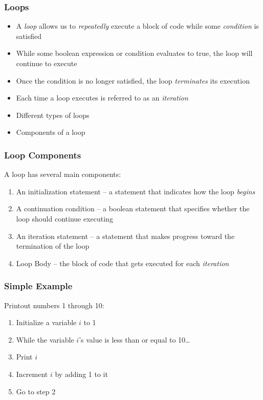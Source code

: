 \documentclass[]{beamer}
\begin{document}
\begin{frame}
  \frametitle{Loops}

  \begin{itemize}[<+->]
    \item A \emph{loop} allows us to \emph{repeatedly} execute a 
      block of code while some \emph{condition} is satisfied
    \item While some boolean expression or condition evaluates to true, the loop will continue to execute
    \item Once the condition is no longer satisfied, the loop 
      \emph{terminates} its execution
    \item Each time a loop executes is referred to as an \emph{iteration}
    \item Different types of loops      
    \item Components of a loop
  \end{itemize}
    
\end{frame}

\begin{frame}
  \frametitle{Loop Components}

  A loop has several main components:
  \begin{enumerate}[<+->]
    \item An initialization statement -- a statement that indicates how the loop \emph{begins}
    \item A continuation condition -- a boolean statement that specifies 
    whether the loop should continue executing
    \item An iteration statement -- a statement that makes progress toward the termination of
    	the loop
    \item Loop Body -- the block of code that gets executed for each \emph{iteration}
  \end{enumerate}

\end{frame}

\begin{frame}
  \frametitle{Simple Example}
  
  Printout numbers 1 through 10:
  \begin{enumerate}
    \item Initialize a variable $i$ to 1
    \item While the variable $i$'s value is less than or equal to 10\ldots
    \item Print $i$
    \item Increment $i$ by adding 1 to it
    \item Go to step 2
  \end{enumerate}

\end{frame}
\end{document}
